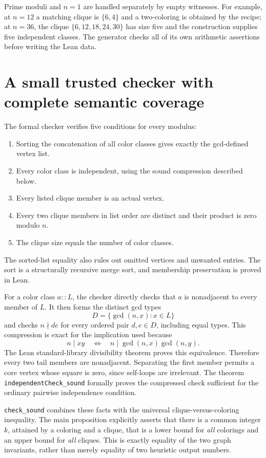 \documentclass[10pt]{article}
\begin{document}
Prime moduli and $n=1$ are handled separately by empty witnesses. For example, at $n=12$ a matching clique is $\{6,4\}$ and a two-coloring is obtained by the recipe; at $n=36$, the clique $\{6,12,18,24,30\}$ has size five and the construction supplies five independent classes. The generator checks all of its own arithmetic assertions before writing the Lean data.
\section{A small trusted checker with complete semantic coverage}
The formal checker verifies five conditions for every modulus:
\begin{enumerate}
\item Sorting the concatenation of all color classes gives exactly the gcd-defined vertex list.
\item Every color class is independent, using the sound compression described below.
\item Every listed clique member is an actual vertex.
\item Every two clique members in list order are distinct and their product is zero modulo $n$.
\item The clique size equals the number of color classes.
\end{enumerate}
The sorted-list equality also rules out omitted vertices and unwanted entries. The sort is a structurally recursive merge sort, and membership preservation is proved in Lean.

For a color class $a::L$, the checker directly checks that $a$ is nonadjacent to every member of $L$. It then forms the distinct gcd types
\[
 D=\{\gcd(n,x):x\in L\}
\]
and checks $n\nmid de$ for every ordered pair $d,e\in D$, including equal types. This compression is exact for the implication used because
\[
 n\mid xy\quad\Longleftrightarrow\quad
 n\mid\gcd(n,x)\gcd(n,y).
\]
The Lean standard-library divisibility theorem proves this equivalence. Therefore every two tail members are nonadjacent. Separating the first member permits a core vertex whose square is zero, since self-loops are irrelevant. The theorem \texttt{independentCheck\_sound} formally proves the compressed check sufficient for the ordinary pairwise independence condition.

\texttt{check\_sound} combines these facts with the universal clique-versus-coloring inequality. The main proposition explicitly asserts that there is a common integer $k$, attained by a coloring and a clique, that is a lower bound for \emph{all} colorings and an upper bound for \emph{all} cliques. This is exactly equality of the two graph invariants, rather than merely equality of two heuristic output numbers.
\end{document}
